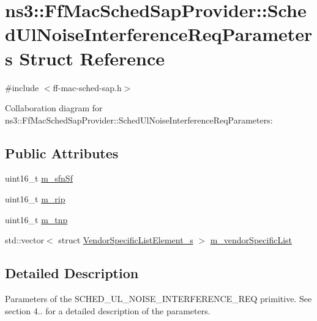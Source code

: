 \hypertarget{structns3_1_1FfMacSchedSapProvider_1_1SchedUlNoiseInterferenceReqParameters}{}\section{ns3\+:\+:Ff\+Mac\+Sched\+Sap\+Provider\+:\+:Sched\+Ul\+Noise\+Interference\+Req\+Parameters Struct Reference}
\label{structns3_1_1FfMacSchedSapProvider_1_1SchedUlNoiseInterferenceReqParameters}


{\ttfamily \#include $<$ff-\/mac-\/sched-\/sap.\+h$>$}



Collaboration diagram for ns3\+:\+:Ff\+Mac\+Sched\+Sap\+Provider\+:\+:Sched\+Ul\+Noise\+Interference\+Req\+Parameters\+:
\subsection*{Public Attributes}
\begin{DoxyCompactItemize}
\item 
uint16\+\_\+t \hyperlink{structns3_1_1FfMacSchedSapProvider_1_1SchedUlNoiseInterferenceReqParameters_a56b0126f76f89ff23cd670db83dfd131}{m\+\_\+sfn\+Sf}
\item 
uint16\+\_\+t \hyperlink{structns3_1_1FfMacSchedSapProvider_1_1SchedUlNoiseInterferenceReqParameters_a98c84f907429d38585f95bf2fc98c5e4}{m\+\_\+rip}
\item 
uint16\+\_\+t \hyperlink{structns3_1_1FfMacSchedSapProvider_1_1SchedUlNoiseInterferenceReqParameters_a053bbc38b5f827580e12d7c370fe65ee}{m\+\_\+tnp}
\item 
std\+::vector$<$ struct \hyperlink{structns3_1_1VendorSpecificListElement__s}{Vendor\+Specific\+List\+Element\+\_\+s} $>$ \hyperlink{structns3_1_1FfMacSchedSapProvider_1_1SchedUlNoiseInterferenceReqParameters_a103541df10fdc0008f8ddce66f25111a}{m\+\_\+vendor\+Specific\+List}
\end{DoxyCompactItemize}


\subsection{Detailed Description}
Parameters of the S\+C\+H\+E\+D\+\_\+\+U\+L\+\_\+\+N\+O\+I\+S\+E\+\_\+\+I\+N\+T\+E\+R\+F\+E\+R\+E\+N\+C\+E\+\_\+\+R\+EQ primitive. See section 4.. for a detailed description of the parameters. 

